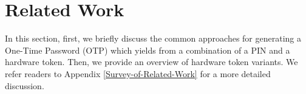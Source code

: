 
\vspace{-5mm}
\section{Related Work}

\vspace{-2mm}



%
%
%


In this section, first, we briefly discuss the common approaches for generating a One-Time Password (OTP) which yields from a combination of a PIN and a hardware token.  Then, we provide an overview of hardware token variants. We refer readers to Appendix \ref{Survey-of-Related-Work} for a more detailed discussion. 

